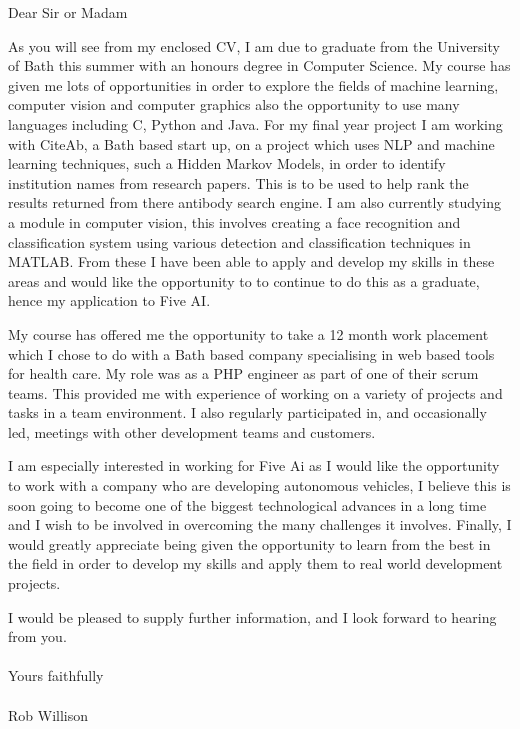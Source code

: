 \documentclass{letter}
\begin{document}
\begin{letter}{}
\vspace*{-10\baselineskip}
\fontsize{12pt}{14pt}\selectfont
\opening{Dear Sir or Madam}

As you will see from my enclosed CV, I am due to graduate from the University of Bath
this summer with an honours degree in Computer Science. My course has given me lots of
opportunities in order to explore the fields of machine learning, computer vision and computer graphics
also the opportunity to use many languages including C, Python and Java. For my final
year project I am working with CiteAb, a Bath based start up, on a project which uses
NLP and machine learning techniques, such a Hidden Markov Models, in order to identify
institution names from research papers. This is to be used to help rank the results
returned from there antibody search engine. I am also currently studying a module in computer vision,
this involves creating a face recognition and classification system using
various detection and classification techniques in MATLAB. From
these I have been able to apply and develop my skills in these areas and would like the
opportunity to to continue to do this as a graduate, hence my application to Five AI.

My course has offered me the opportunity to take a 12 month work placement which I chose to do
with a Bath based company specialising in web based tools for health care. My role was
as a PHP engineer as part of one of their scrum teams. This provided me with experience of working on a variety of
projects and tasks in a team environment. I also regularly participated in, and occasionally led,
meetings with other development teams and customers.

I am especially interested in working for Five Ai as I would like the opportunity to work
with a company who are developing autonomous vehicles, I believe this is soon going to
become one of the biggest technological advances in a long time and I wish to be involved
in overcoming the many challenges it involves. Finally, I would greatly appreciate being given the opportunity to learn from the best in the field in order to
develop my skills and apply them to real world development projects.

I would be pleased to supply further information, and I look forward to hearing from you.
\\~\\
Yours faithfully
\\~\\
Rob Willison

\end{letter}
\end{document}
